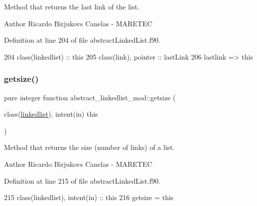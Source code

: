 Method that returns the last link of the list. 

\begin{DoxyAuthor}{Author}
Ricardo Birjukovs Canelas -\/ M\+A\+R\+E\+T\+EC 
\end{DoxyAuthor}


Definition at line 204 of file abstract\+Linked\+List.\+f90.


\begin{DoxyCode}
204     \textcolor{keywordtype}{class}(linkedlist) :: this
205     \textcolor{keywordtype}{class}(link), \textcolor{keywordtype}{pointer} :: lastLink
206     lastlink => this%
\end{DoxyCode}
\mbox{\label{namespaceabstract__linkedlist__mod_ab4e548906863da517d7fedb02931b79f}} 
\subsubsection{\texorpdfstring{getsize()}{getsize()}}
{\footnotesize\ttfamily pure integer function abstract\+\_\+linkedlist\+\_\+mod\+::getsize (\begin{DoxyParamCaption}\item[{class(\mbox{\hyperlink{structabstract__linkedlist__mod_1_1linkedlist}{linkedlist}}), intent(in)}]{this }\end{DoxyParamCaption})\hspace{0.3cm}{\ttfamily [private]}}



Method that returns the size (number of links) of a list. 

\begin{DoxyAuthor}{Author}
Ricardo Birjukovs Canelas -\/ M\+A\+R\+E\+T\+EC 
\end{DoxyAuthor}


Definition at line 215 of file abstract\+Linked\+List.\+f90.


\begin{DoxyCode}
215     \textcolor{keywordtype}{class}(linkedlist), \textcolor{keywordtype}{intent(in)} :: this
216     getsize = this%
\end{DoxyCode}
\mbox{\label{namespaceabstract__linkedlist__mod_a3c3ad627fd9f87da9831c53802975104}} 
